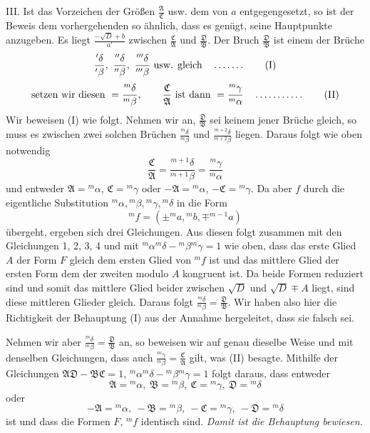 III. Ist das Vorzeichen der Größen $\frac{\mathfrak{A}}{\mathfrak{C}}$ usw. dem von $a$ entgegengesetzt, so ist der Beweis dem vorhergehenden so ähnlich, dass es genügt, seine Hauptpunkte anzugeben. Es liegt $\frac{-\surd D+b}{a'}$ zwischen $\frac{\mathfrak{C}}{\mathfrak{A}}$ und $\frac{\mathfrak{D}}{\mathfrak{B}}$. Der Bruch $\frac{\mathfrak{D}}{\mathfrak{B}}$ ist einem der Brüche
\begin{equation*}
\frac{{}'\delta}{{}'\beta},\ \frac{{}''\delta}{{}''\beta},\ \frac{{}'''\delta}{{}'''\beta}\text{ usw. gleich}
\quad \mathinner{\ldotp\ldotp\ldotp\ldotp\ldotp\ldotp\ldotp} \tag*{(I)}
\end{equation*}
\begin{equation*}
\text{setzen wir diesen }=\frac{{}^m\delta}{{}^m\beta},\qquad \frac{\mathfrak{C}}{\mathfrak{A}}\text{ ist dann }=\frac{{}^m\gamma}{{}^m\alpha}
\quad \mathinner{\ldotp\ldotp\ldotp\ldotp\ldotp\ldotp\ldotp\ldotp\ldotp\ldotp\ldotp} \tag*{(II)}
\end{equation*}
Wir beweisen (I) wie folgt. Nehmen wir an, $\frac{\mathfrak{D}}{\mathfrak{B}}$ sei keinem jener Brüche gleich, so muss es zwischen zwei solchen Brüchen $\frac{{}^m\delta}{{}^m\beta}$ und $\frac{{}^{m+2}\delta}{{}^{m+2}\beta}$ liegen. Daraus folgt wie oben notwendig
\[
\frac{\mathfrak{C}}{\mathfrak{A}}=\frac{{}^{m+1}\delta}{{}^{m+1}\beta}=\frac{{}^m\gamma}{{}^m\alpha}
\]
und entweder $\mathfrak{A}={}^m\alpha$, $\mathfrak{C}={}^m\gamma$ oder $-\mathfrak{A}={}^m\alpha$, $-\mathfrak{C}={}^m\gamma$. Da aber $f$ durch die eigentliche Substitution ${}^m\alpha,{}^m\beta,{}^m\gamma,{}^m\delta$ in die Form
\[
{}^m f=(\pm{}^m a,{}^m b,\mp{}^{m-1}a)
\]
übergeht, ergeben sich drei Gleichungen. Aus diesen folgt zusammen mit den Gleichungen 1, 2, 3, 4 und mit ${}^m\alpha{}^m\delta-{}^m\beta{}^m\gamma=1$ wie oben, dass das erste Glied $A$ der Form $F$ gleich dem ersten Glied von ${}^m f$ ist und das mittlere Glied der ersten Form dem der zweiten modulo $A$ kongruent ist. Da beide Formen reduziert sind und somit das mittlere Glied beider zwischen $\surd D$ und $\surd D\mp A$ liegt, sind diese mittleren Glieder gleich. Daraus folgt $\frac{{}^m\delta}{{}^m\beta}=\frac{\mathfrak{D}}{\mathfrak{B}}$. Wir haben also hier die Richtigkeit der Behauptung (I) aus der Annahme hergeleitet, dass sie falsch sei.

Nehmen wir aber $\frac{{}^m\delta}{{}^m\beta}=\frac{\mathfrak{D}}{\mathfrak{B}}$ an, so beweisen wir auf genau dieselbe Weise und mit denselben Gleichungen,
dass auch ${\frac{{}^m\gamma}{{}^m\beta}}=\frac{\mathfrak{C}}{\mathfrak{A}}$ gilt, was (II) besagte. Mithilfe der Gleichungen $\mathfrak{A}\mathfrak{D}-\mathfrak{B}\mathfrak{C}=1$, ${}^m\alpha{}^m\delta-{}^m\beta{}^m\gamma=1$ folgt daraus, dass entweder
\[
\mathfrak{A}={}^m\alpha,\ \mathfrak{B}={}^m\beta,\ \mathfrak{C}={}^m\gamma,\ \mathfrak{D}={}^m\delta
\]
oder
\[
-\mathfrak{A}={}^m\alpha,\ -\mathfrak{B}={}^m\beta,\ -\mathfrak{C}={}^m\gamma,\ -\mathfrak{D}={}^m\delta
\]
ist und dass die Formen $F$, ${}^m f$ identisch sind. \textit{Damit ist die Behauptung bewiesen.}

